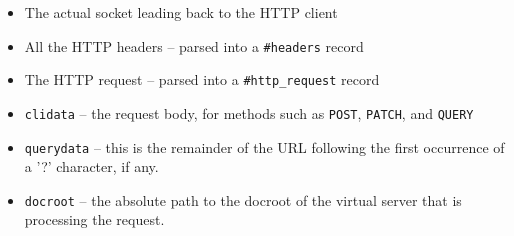 \documentclass[11pt,oneside,english]{book}
\begin{document}
\begin{itemize}

\item The actual socket leading back to the HTTP client
\item All the HTTP headers -- parsed into a \verb+#headers+ record
\item The HTTP request -- parsed into a \verb+#http_request+ record
\item \verb+clidata+ -- the request body, for methods such as
  \verb+POST+, \verb+PATCH+, and \verb+QUERY+
\item \verb+querydata+ -- this is the remainder of the URL following
  the first occurrence of a '?' character, if any.
\item \verb+docroot+ -- the absolute path to the docroot of the
  virtual server that is processing the request.
\end{itemize}
\end{document}

